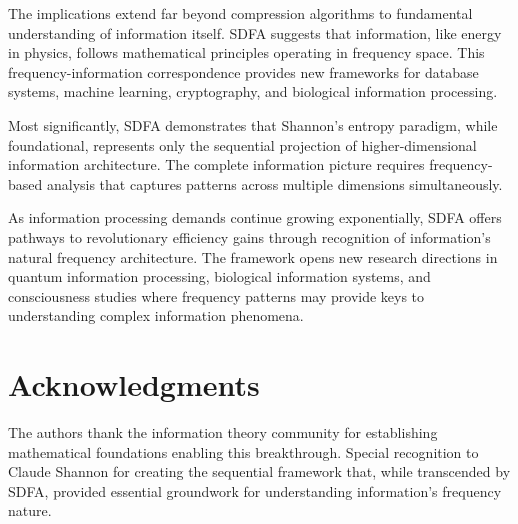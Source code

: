 \documentclass[10pt,journal,compsoc]{IEEEtran}
\newcommand{\sdfa}{\textsc{SDFA}}
\begin{document}
The implications extend far beyond compression algorithms to fundamental understanding of information itself. \sdfa{} suggests that information, like energy in physics, follows mathematical principles operating in frequency space. This frequency-information correspondence provides new frameworks for database systems, machine learning, cryptography, and biological information processing.

Most significantly, \sdfa{} demonstrates that Shannon's entropy paradigm, while foundational, represents only the sequential projection of higher-dimensional information architecture. The complete information picture requires frequency-based analysis that captures patterns across multiple dimensions simultaneously.

As information processing demands continue growing exponentially, \sdfa{} offers pathways to revolutionary efficiency gains through recognition of information's natural frequency architecture. The framework opens new research directions in quantum information processing, biological information systems, and consciousness studies where frequency patterns may provide keys to understanding complex information phenomena.

\section*{Acknowledgments}

The authors thank the information theory community for establishing mathematical foundations enabling this breakthrough. Special recognition to Claude Shannon for creating the sequential framework that, while transcended by \sdfa{}, provided essential groundwork for understanding information's frequency nature.



\end{document}
